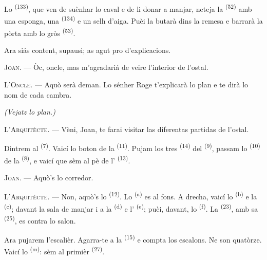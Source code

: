 Lo  \textsuperscript{(133)}, que ven de suènhar lo caval
e de li donar a manjar, neteja la  \textsuperscript{(52)} amb una
esponga, una  \textsuperscript{(134)} e un selh d'aiga. Puèi
la butarà dins la remesa e barrarà la pòrta amb lo gròs 
\textsuperscript{(53)}.

Ara siás content, supausi; as agut pro d'explicacions.

\textsc{Joan}. --- Òc, oncle, mas m'agradariá de veire l'interior de l'ostal.

\textsc{L'Oncle}. --- Aquò serà deman. Lo sénher Roge t'explicarà lo plan e te
dirà lo nom de cada cambra.

\VUsaut{3.0mm}
\VUsaut{2.4mm}

{\centering\textit{(Vejatz lo plan.)}\par}
\VUsaut{2.4mm}

\textsc{L'Arquitècte}. --- Vèni, Joan, te farai visitar las diferentas partidas de
l'ostal.

Dintrem al  \textsuperscript{(7)}. Vaicí lo boton de la
 \textsuperscript{(11)}. Pujam los tres 
\textsuperscript{(14)} del  \textsuperscript{(9)}, passam lo
 \textsuperscript{(10)} de la 
\textsuperscript{(8)}, e vaicí que sèm al pè de l'
\textsuperscript{(13)}.

\textsc{Joan}. --- Aquò's lo corredor.

\textsc{L'Arquitècte}. --- Non, aquò's lo 
\textsuperscript{(12)}. Lo  \textsuperscript{(a)} es al fons. A
drecha, vaicí lo  \textsuperscript{(b)} e la  \textsuperscript{(c)}; davant la sala de manjar i a la 
\textsuperscript{(d)} e l' \textsuperscript{(e)}; puèi, davant, lo
 \textsuperscript{(f)}. La 
\textsuperscript{(23)}, amb sa  \textsuperscript{(25)}, es
contra lo salon.

Ara pujarem l'escalièr. Agarra-te a la  \textsuperscript{(15)} e
compta los escalons. Ne son quatòrze. Vaicí lo 
\textsuperscript{(m)}: sèm al primièr  \textsuperscript{(27)}.

